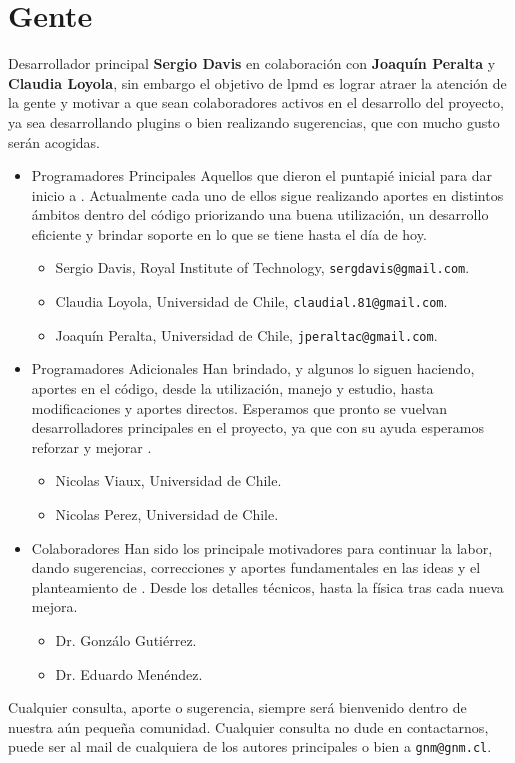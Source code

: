 \chapter{Gente}
\label{chap:auth}

Desarrollador principal \textbf{Sergio Davis} en colaboraci\'on con \textbf{Joaqu\'in Peralta} y \textbf{Claudia Loyola}, sin embargo el objetivo de lpmd es lograr atraer la atenci\'on de la gente y motivar a que sean colaboradores activos en el desarrollo del proyecto, ya sea desarrollando plugins o bien realizando sugerencias, que con mucho gusto ser\'an acogidas.

\begin{itemize}

\item {Programadores Principales} Aquellos que dieron el puntapi\'e inicial para dar inicio a \lpmd. Actualmente cada uno de ellos sigue realizando aportes en distintos \'ambitos dentro del c\'odigo priorizando una buena utilizaci\'on, un desarrollo eficiente y brindar soporte en lo que se tiene hasta el d\'ia de hoy.

\begin{itemize}
 \item Sergio Davis, Royal Institute of Technology, \verb|sergdavis@gmail.com|.
 \item Claudia Loyola, Universidad de Chile, \verb|claudial.81@gmail.com|.
 \item Joaqu\'in Peralta, Universidad de Chile, \verb|jperaltac@gmail.com|.
\end{itemize}

\item {Programadores Adicionales} Han brindado, y algunos lo siguen haciendo, aportes en el c\'odigo, desde la utilizaci\'on, manejo y estudio, hasta modificaciones y aportes directos. Esperamos que pronto se vuelvan desarrolladores principales en el proyecto, ya que con su ayuda esperamos reforzar y mejorar \lpmd.

\begin{itemize}
 \item Nicolas Viaux, Universidad de Chile.
 \item Nicolas Perez, Universidad de Chile.
\end{itemize}

\item{Colaboradores} Han sido los principale motivadores para continuar la labor, dando sugerencias, correcciones y aportes fundamentales en las ideas y el planteamiento de \lpmd. Desde los detalles t\'ecnicos, hasta la f\'isica tras cada nueva mejora.

\begin{itemize}
 \item Dr. Gonz\'alo Guti\'errez.
 \item Dr. Eduardo Men\'endez.
\end{itemize}
\end{itemize}

Cualquier consulta, aporte o sugerencia, siempre ser\'a bienvenido dentro de nuestra a\'un peque\~na comunidad. Cualquier consulta no dude en contactarnos, puede ser al mail de cualquiera de los autores principales o bien a \verb|gnm@gnm.cl|.
